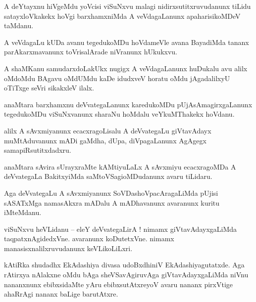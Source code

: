 \documentclass{article}
\begin{document}
\begin{mn}%
A deYtayxnu hiVgeMdu yoVcisi viSuNxvu malagi nidirxsutitxruvudanunx tiLidu satayxloVkakekx hoVgi 
barxhamxniMda A veVdagaLanunx apaharisikoMDeV taMdanu.
\end{mn}

\begin{mn}%
A veVdagaLu kUDa avanu tegedukoMDu hoVdameVle avana BayadiMda tananx parAkarxmavanunx toVrisalArade 
niVranunx hUkukxvu.
\end{mn}

\begin{mn}%
A shaMKanu samudarxdoLakUkx nugigx A veVdagaLanunx huDukalu avu alilx oMdoMdu BAgavu oMdUMdu kaDe 
idudxveV horatu oMdu jAgadalilxyU oTiTxge seVri sikakxleV ilalx.
\end{mn}

\begin{mn}%
anaMtara barxhamxnu deVvategaLanunx karedukoMDu pUjAsAmagirxgaLanunx tegedukoMDu viSuNxvanunx 
sharaNu hoMdalu veYkuMThakekx hoVdanu.
\end{mn}

\begin{mn}%
alilx A sAvxmiyanunx ecacxragoLisalu A deVvategaLu giVtavAdayx muMtAduvanunx mADi gaMdha, dUpa, 
diVpagaLanunx AgAgegx samapiRsutitxdadxru.
\end{mn}

\begin{mn}%
anaMtara sAvira sUrayxraMte kAMtiyuLaLx A sAvxmiyu ecacxragoMDa A deVvategaLa BakitxyiMda 
saMtoVSagioMDudanunx avaru tiLidaru.
\end{mn}

\begin{mn}%
Aga deVvategaLu A sAvxmiyanunx SoVDashoVpacAragaLiMda pUjisi sASATxMga namasAkxra mADalu A 
mADhavanunx avaranunx kuritu iMteMdanu.
\end{mn}

\begin{mn}%
viSuNxvu heVLidanu -- eleY deVvategaLirA ! nimamx giVtavAdayxgaLiMda taqpatxnAgidedxVne. avaranunx 
koDutetxVne. nimamx manasisxnalilxruvudanunx keVLikoLiLxri.
\end{mn}

\begin{mn}%
kAtiRka shudadhx EkAdashiya divasa udoBxdhiniV EkAdashiyagutatxde. Aga rAtirxya nAlakxne oMdu bAga 
sheVSavAgiruvAga giVtavAdayxgaLiMda niVnu nananxnunx ebibxsidaMte yAru ebibxsutAtxreyoV avaru 
nananx pirxVtige ahaRrAgi nananx baLige barutAtxre.
\end{mn}
\end{document}
